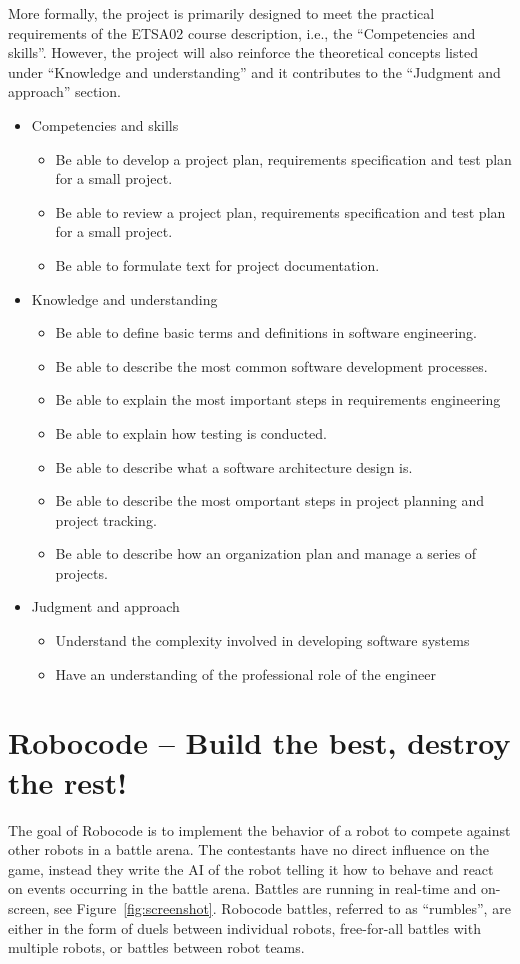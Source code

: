 \documentclass{scrreprt}
\begin{document}
More formally, the project is primarily designed to meet the practical requirements of the ETSA02 course description, i.e., the ``Competencies and skills''. However, the project will also reinforce the theoretical concepts listed under ``Knowledge and understanding'' and it contributes to the ``Judgment and approach'' section.
\begin{itemize}
\item Competencies and skills
\begin{itemize}
\item Be able to develop a project plan, requirements specification and test plan for a small project.
\item Be able to review a project plan, requirements specification and test plan for a small project.
\item Be able to formulate text for project documentation.
\end{itemize}
\item Knowledge and understanding
\begin{itemize}
\item Be able to define basic terms and definitions in software engineering.
\item Be able to describe the most common software development processes.
\item Be able to explain the most important steps in requirements engineering
\item Be able to explain how testing is conducted.
\item Be able to describe what a software architecture design is.
\item Be able to describe the most omportant steps in project planning and project tracking.
\item Be able to describe how an organization plan and manage a series of projects.
\end{itemize}
\item Judgment and approach
\begin{itemize}
\item Understand the complexity involved in developing software systems
\item Have an understanding of the professional role of the engineer
\end{itemize}
\end{itemize}

\section{Robocode -- Build the best, destroy the rest!}
The goal of Robocode is to implement the behavior of a robot to compete against other robots in a battle arena. The contestants have no direct influence on the game, instead they write the AI of the robot telling it how to behave and react on events occurring in the battle arena. Battles are running in real-time and on-screen, see Figure~\ref{fig:screenshot}. Robocode battles, referred to as ``rumbles'', are either in the form of duels between individual robots, free-for-all battles with multiple robots, or battles between robot teams.
\end{document}
